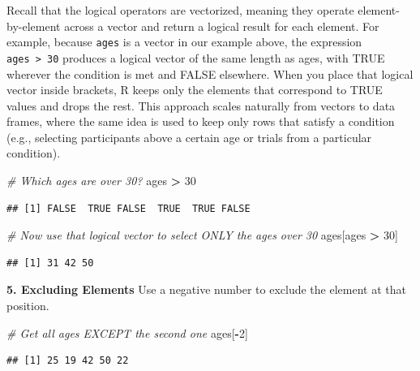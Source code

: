 \documentclass[
  11pt,
]{article}
\newenvironment{Shaded}{\begin{snugshade}}{\end{snugshade}}
\newcommand{\CommentTok}[1]{\textcolor[rgb]{0.56,0.35,0.01}{\textit{#1}}}
\newcommand{\DecValTok}[1]{\textcolor[rgb]{0.00,0.00,0.81}{#1}}
\newcommand{\NormalTok}[1]{#1}
\newcommand{\SpecialCharTok}[1]{\textcolor[rgb]{0.81,0.36,0.00}{\textbf{#1}}}
\begin{document}
Recall that the logical operators are vectorized, meaning they operate
element-by-element across a vector and return a logical result for each
element. For example, because \texttt{ages} is a vector in our example
above, the expression \texttt{ages\ \textgreater{}\ 30} produces a
logical vector of the same length as ages, with TRUE wherever the
condition is met and FALSE elsewhere. When you place that logical vector
inside brackets, R keeps only the elements that correspond to TRUE
values and drops the rest. This approach scales naturally from vectors
to data frames, where the same idea is used to keep only rows that
satisfy a condition (e.g., selecting participants above a certain age or
trials from a particular condition).

\begin{Shaded}
\begin{Highlighting}[]
\CommentTok{\# Which ages are over 30?}
\NormalTok{ages }\SpecialCharTok{\textgreater{}} \DecValTok{30}
\end{Highlighting}
\end{Shaded}

\begin{verbatim}
## [1] FALSE  TRUE FALSE  TRUE  TRUE FALSE
\end{verbatim}

\begin{Shaded}
\begin{Highlighting}[]
\CommentTok{\# Now use that logical vector to select ONLY the ages over 30}
\NormalTok{ages[ages }\SpecialCharTok{\textgreater{}} \DecValTok{30}\NormalTok{]}
\end{Highlighting}
\end{Shaded}

\begin{verbatim}
## [1] 31 42 50
\end{verbatim}

\textbf{5. Excluding Elements} Use a negative number to exclude the
element at that position.

\begin{Shaded}
\begin{Highlighting}[]
\CommentTok{\# Get all ages EXCEPT the second one}
\NormalTok{ages[}\SpecialCharTok{{-}}\DecValTok{2}\NormalTok{]}
\end{Highlighting}
\end{Shaded}

\begin{verbatim}
## [1] 25 19 42 50 22
\end{verbatim}
\end{document}
